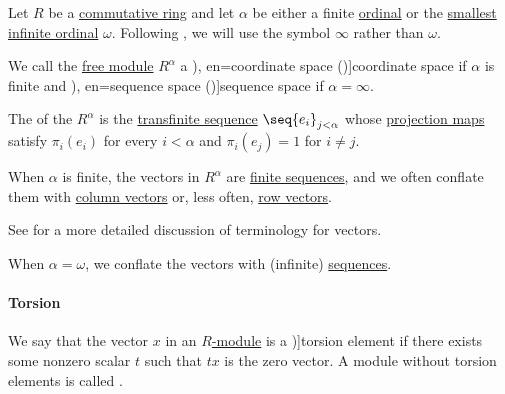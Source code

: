 \begin{definition}\label{def:sequence_space}\mimprovised
  Let \( R \) be a \hyperref[def:ring/commutative]{commutative ring} and let \( \alpha \) be either a finite \hyperref[def:ordinal]{ordinal} or the \hyperref[thm:omega_is_an_ordinal]{smallest infinite ordinal} \( \omega \). Following , we will use the symbol \( \infty \) rather than \( \omega \).

  We call the \hyperref[def:free_semimodule]{free module} \( R^\alpha \) a \term[ru=координатное пространство (\cite[443]{ИльинСадовничийСендов1985АнализТом1}), en=coordinate space (\cite[rem. 2.8]{Treil2017LinearAlgebraDoneWrong})]{coordinate space} if \( \alpha \) is finite and \term[ru=пространство последовательностей (вещественных чисел) (\cite[452]{Фихтенгольц1968ОсновыАнализаТом2}), en=sequence space (\cite[example 1.1.4]{Roman2005AdvancedLinearAlgebra})]{sequence space} if \( \alpha = \infty \).

  The  of the \( R^\alpha \) is the \hyperref[def:transfinite_sequence]{transfinite sequence} \( \seq{ e_i }_{j < \alpha} \) whose \hyperref[def:basis_decomposition]{projection maps} satisfy \( \pi_i(e_i) \) for every \( i < \alpha \) and \( \pi_i(e_j) = 1 \) for \( i \neq j \).

  When \( \alpha \) is finite, the vectors in \( R^\alpha \) are \hyperref[def:sequence]{finite sequences}, and we often conflate them with \hyperref[def:array/column_vector]{column vectors} or, less often, \hyperref[def:array/row_vector]{row vectors}.
\end{definition}
\begin{comments}
  \item See  for a more detailed discussion of terminology for vectors.
  \item When \( \alpha = \omega \), we conflate the vectors with (infinite) \hyperref[def:sequence]{sequences}.
\end{comments}

\paragraph{Torsion}

\begin{definition}\label{def:module_torsion}
  We say that the vector \( x \) in an \hyperref[def:module]{\( R \)-module} is a \term[ru=элемент кручения (\cite[57]{Шафаревич1999ОсновныеПонятияАлгебры})]{torsion element} if there exists some nonzero scalar \( t \) such that \( tx \) is the zero vector. A module without torsion elements is called .
\end{definition}

